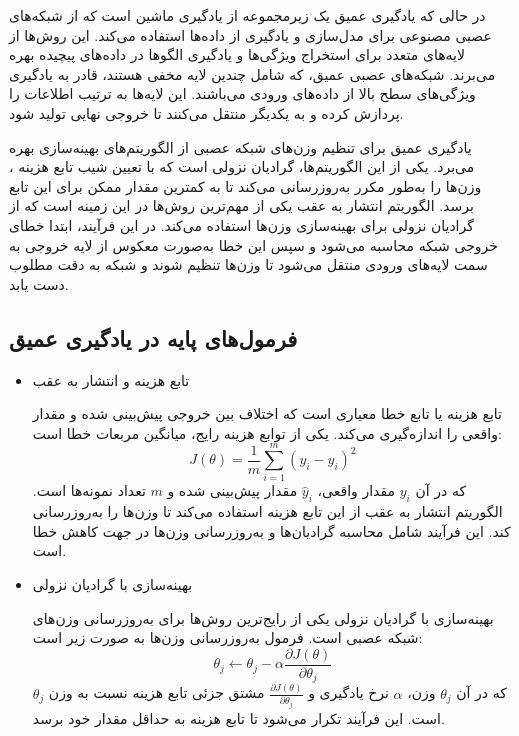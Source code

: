 در حالی که یادگیری عمیق یک زیرمجموعه از یادگیری ماشین است که از شبکه‌های عصبی مصنوعی برای مدل‌سازی و یادگیری از داده‌ها استفاده می‌کند. این روش‌ها از لایه‌های متعدد برای استخراج ویژگی‌ها و یادگیری الگوها در داده‌های پیچیده بهره می‌برند. شبکه‌های عصبی عمیق، که شامل چندین لایه مخفی هستند، قادر به یادگیری ویژگی‌های سطح بالا از داده‌های ورودی می‌باشند. این لایه‌ها به ترتیب اطلاعات را پردازش کرده و به یکدیگر منتقل می‌کنند تا خروجی نهایی تولید شود.

یادگیری عمیق برای تنظیم وزن‌های شبکه عصبی از الگوریتم‌های بهینه‌سازی بهره می‌برد. یکی از این الگوریتم‌ها، گرادیان نزولی%
است که با تعیین شیب تابع هزینه%
%
، وزن‌ها را به‌طور مکرر به‌روزرسانی می‌کند تا به کمترین مقدار ممکن برای این تابع برسد. الگوریتم انتشار به عقب%
یکی از مهم‌ترین روش‌ها در این زمینه است که از گرادیان نزولی برای بهینه‌سازی وزن‌ها استفاده می‌کند. در این فرآیند، ابتدا خطای خروجی شبکه محاسبه می‌شود و سپس این خطا به‌صورت معکوس از لایه خروجی به سمت لایه‌های ورودی منتقل می‌شود تا وزن‌ها تنظیم شوند و شبکه به دقت مطلوب دست یابد.


\subsection{فرمول‌های پایه در یادگیری عمیق}
\begin{itemize}
\item تابع هزینه و انتشار به عقب

تابع هزینه یا تابع خطا معیاری است که اختلاف بین خروجی پیش‌بینی شده و مقدار واقعی را اندازه‌گیری می‌کند. یکی از توابع هزینه رایج، میانگین مربعات خطا%
است:
\begin{equation}
	J(\theta) = \frac{1}{m} \sum_{i=1}^{m} (y_i - \hat{y}_i)^2
\end{equation}
که در آن
$y_i$
مقدار واقعی،
$\hat{y}_i$
مقدار پیش‌بینی شده و
$m$
تعداد نمونه‌ها است. الگوریتم انتشار به عقب از این تابع هزینه استفاده می‌کند تا وزن‌ها را به‌روزرسانی کند. این فرآیند شامل محاسبه گرادیان‌ها و به‌روزرسانی وزن‌ها در جهت کاهش خطا است.


\item بهینه‌سازی با گرادیان نزولی

بهینه‌سازی با گرادیان نزولی یکی از رایج‌ترین روش‌ها برای به‌روزرسانی وزن‌های شبکه عصبی است. فرمول به‌روزرسانی وزن‌ها به صورت زیر است:
\begin{equation}
	\theta_{j} \leftarrow \theta_{j} - \alpha \frac{\partial J(\theta)}{\partial \theta_{j}}
\end{equation}
که در آن
$\theta_{j}$
وزن،
$\alpha$
نرخ یادگیری و
$\frac{\partial J(\theta)}{\partial \theta_{j}}$
مشتق جزئی تابع هزینه نسبت به وزن
$\theta_{j}$
است. این فرآیند تکرار می‌شود تا تابع هزینه به حداقل مقدار خود برسد.
\end{itemize}


